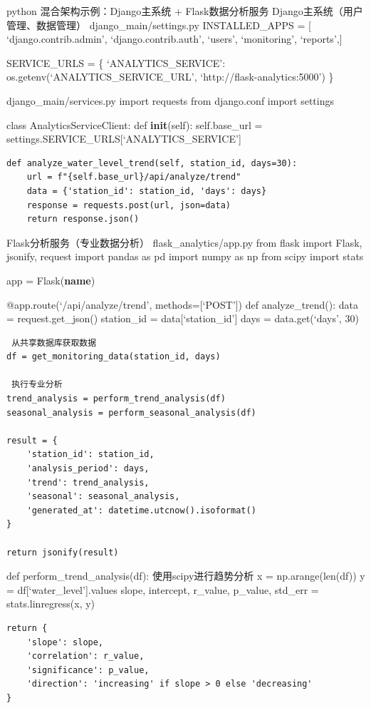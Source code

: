python  混合架构示例：Django主系统 + Flask数据分析服务  Django主系统（用户管理、数据管理）  django\_main/settings.py INSTALLED\_APPS = {[} `django.contrib.admin', `django.contrib.auth', `users', `monitoring', `reports',{]}

SERVICE\_URLS = \{ `ANALYTICS\_SERVICE': os.getenv(`ANALYTICS\_SERVICE\_URL', `http://flask-analytics:5000') \}

 django\_main/services.py import requests from django.conf import settings

class AnalyticsServiceClient: def \textbf{init}(self): self.base\_url = settings.SERVICE\_URLS{[}`ANALYTICS\_SERVICE'{]}

\begin{verbatim}
def analyze_water_level_trend(self, station_id, days=30):
    url = f"{self.base_url}/api/analyze/trend"
    data = {'station_id': station_id, 'days': days}
    response = requests.post(url, json=data)
    return response.json()
\end{verbatim}

 Flask分析服务（专业数据分析）  flask\_analytics/app.py from flask import Flask, jsonify, request import pandas as pd import numpy as np from scipy import stats

app = Flask(\textbf{name})

@app.route(`/api/analyze/trend', methods={[}`POST'{]}) def analyze\_trend(): data = request.get\_json() station\_id = data{[}`station\_id'{]} days = data.get(`days', 30)

\begin{verbatim}
 从共享数据库获取数据
df = get_monitoring_data(station_id, days)

 执行专业分析
trend_analysis = perform_trend_analysis(df)
seasonal_analysis = perform_seasonal_analysis(df)

result = {
    'station_id': station_id,
    'analysis_period': days,
    'trend': trend_analysis,
    'seasonal': seasonal_analysis,
    'generated_at': datetime.utcnow().isoformat()
}

return jsonify(result)
\end{verbatim}

def perform\_trend\_analysis(df):  使用scipy进行趋势分析 x = np.arange(len(df)) y = df{[}`water\_level'{]}.values slope, intercept, r\_value, p\_value, std\_err = stats.linregress(x, y)

\begin{verbatim}
return {
    'slope': slope,
    'correlation': r_value,
    'significance': p_value,
    'direction': 'increasing' if slope > 0 else 'decreasing'
}
\end{verbatim}

